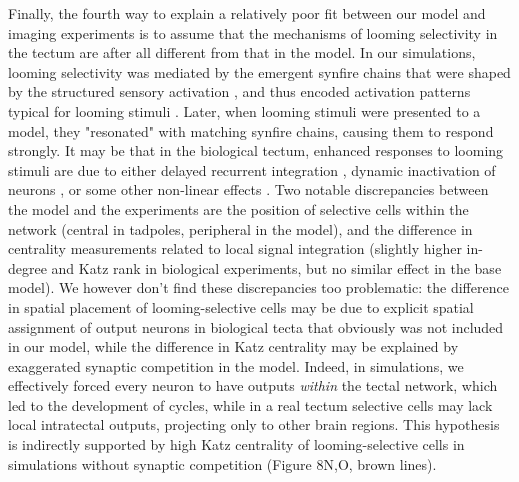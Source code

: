 \documentclass{article}
\begin{document}
Finally, the fourth way to explain a relatively poor fit between our model and imaging experiments is to assume that the mechanisms of looming selectivity in the tectum are after all different from that in the model. In our simulations, looming selectivity was mediated by the emergent synfire chains \citep{cohen2002synreview, zheng2014synfire} that were shaped by the structured sensory activation \citep{vislay2006rf, clopath2010stdpcoding}, and thus encoded activation patterns typical for looming stimuli \citep{pratt2008recurrent, richards2010stdp}. Later, when looming stimuli were presented to a model, they "resonated" with matching synfire chains, causing them to respond strongly. It may be that in the biological tectum, enhanced responses to looming stimuli are due to either delayed recurrent integration \citep{khakhalin2014, jang2016}, dynamic inactivation of neurons \citep{fotowat2011multiplexing}, or some other non-linear effects \citep{baginskas2009recurrent}. Two notable discrepancies between the model and the experiments are the position of selective cells within the network (central in tadpoles, peripheral in the model), and the difference in centrality measurements related to local signal integration (slightly higher in-degree and Katz rank in biological experiments, but no similar effect in the base model). We however don't find these discrepancies too problematic: the difference in spatial placement of looming-selective cells may be due to explicit spatial assignment of output neurons in biological tecta that obviously was not included in our model, while the difference in Katz centrality may be explained by exaggerated synaptic competition in the model. Indeed, in simulations, we effectively forced every neuron to have outputs \textit{within} the tectal network, which led to the development of cycles, while in a real tectum selective cells may lack local intratectal outputs, projecting only to other brain regions. This hypothesis is indirectly supported by high Katz centrality of looming-selective cells in simulations without synaptic competition (Figure 8N,O, brown lines).
\end{document}
